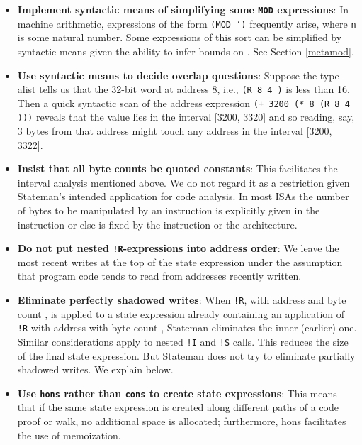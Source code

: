 \documentclass[submission,copyright,creativecommons]{eptcs}
\newcommand{\ptt}[1]{\tt{#1}}
\begin{document}
\begin{itemize}
\item {\bf{Implement syntactic means of simplifying some {\ptt{MOD}}
    expressions}}: In machine arithmetic, expressions of the form {\ptt{(MOD
     ')}} frequently arise, where {\ptt{n}} is some natural
  number.  Some expressions of this sort can be simplified by syntactic means given
  the ability to infer bounds on .  See Section \ref{metamod}.

\item {\bf{Use syntactic means to decide overlap questions}}: Suppose the type-alist
  tells us that the 32-bit word at address 8, i.e., {\ptt{(R 8 4 )}} is
  less than 16.  Then a quick syntactic scan of the address expression
  {\ptt{(+ 3200 (* 8 (R 8 4 )))}} reveals that the value lies in the
  interval [3200, 3320] and so reading, say, 3 bytes from that address might
  touch any address in the interval [3200, 3322].

\item {\bf{Insist that all byte counts be quoted constants}}: This facilitates the
  interval analysis mentioned above.  We do not regard it as a restriction
  given Stateman's intended application for code analysis.  In most ISAs the
  number of bytes to be manipulated by an instruction is explicitly given in
  the instruction or else is fixed by the instruction or the architecture.

\item {\bf{Do not put nested {\ptt{!R}}-expressions into address order}}: We
  leave the most recent writes at the top of the state expression under the
  assumption that program code tends to read from addresses recently written.

\item {\bf{Eliminate perfectly shadowed writes}}: When {\ptt{!R}}, with address  and
  byte count , is applied to a state expression already containing an application of
  {\ptt{!R}} with address  with byte count , Stateman eliminates the inner (earlier) one.
  Similar considerations apply to nested {\ptt{!I}} and {\ptt{!S}} calls.
  This reduces the size of the final state expression.  But Stateman does not
  try to eliminate partially shadowed writes.  We explain below.

\item {\bf{Use {\ptt{hons}} rather than {\ptt{cons}} to create state expressions}}:
  This means that if the same state expression is created along different paths of
  a code proof or walk, no additional space is allocated; furthermore,
  hons facilitates the use of memoization.


\end{itemize}
\end{document}
